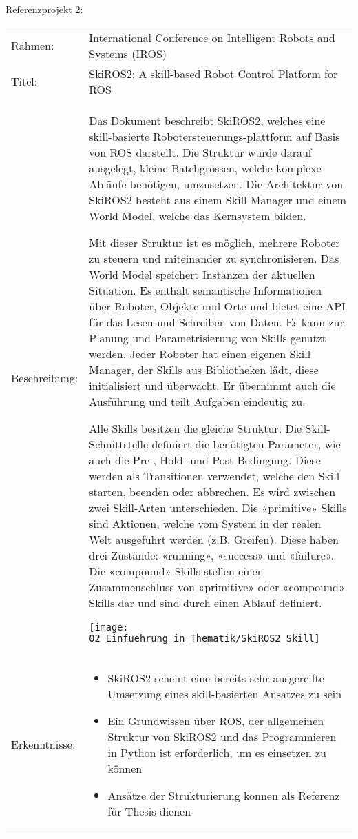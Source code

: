 	\newpage
	
	Referenzprojekt 2:
	\vspace{2mm}
	\\
	\begin{tabularx}{\textwidth}{@{}>{}p{8em} X@{}}
		Rahmen: & 
		International Conference on Intelligent Robots and Systems (IROS)
		\\
		
		Titel: & 
		SkiROS2: A skill-based Robot Control Platform for ROS 
		\\
		
		Beschreibung: & 
		Das Dokument beschreibt SkiROS2, welches eine skill-basierte Robotersteuerungs-plattform auf Basis von ROS darstellt.  Die Struktur wurde darauf ausgelegt, kleine Batchgrössen, welche komplexe Abläufe benötigen, umzusetzen.  Die Architektur von SkiROS2 besteht aus einem Skill Manager und einem World Model, welche das Kernsystem bilden.
		
		Mit dieser Struktur ist es möglich, mehrere Roboter zu steuern und miteinander zu synchronisieren. Das World Model speichert Instanzen der aktuellen Situation. Es enthält semantische Informationen über Roboter, Objekte und Orte und bietet eine API für das Lesen und Schreiben von Daten. Es kann zur Planung und Parametrisierung von Skills genutzt werden. Jeder Roboter hat einen eigenen Skill Manager, der Skills aus Bibliotheken lädt, diese initialisiert und überwacht. Er übernimmt auch die Ausführung und teilt Aufgaben eindeutig zu.
		
		Alle Skills besitzen die gleiche Struktur. Die Skill-Schnittstelle definiert die benötigten Parameter, wie auch die Pre-, Hold- und Post-Bedingung. Diese werden als Transitionen verwendet, welche den Skill starten, beenden oder abbrechen. Es wird zwischen zwei Skill-Arten unterschieden. Die «primitive» Skills sind Aktionen, welche vom System in der realen Welt ausgeführt werden (z.B. Greifen). Diese haben drei Zustände: «running», «success» und «failure». Die «compound» Skills stellen einen Zusammenschluss von «primitive» oder «compound» Skills dar und sind durch einen Ablauf definiert. 
		
		\texttt{[image: 02\_Einfuehrung\_in\_Thematik/SkiROS2\_Skill]}
		\\
		
		Erkenntnisse: & 
		\begin{itemize}
			\item SkiROS2 scheint eine bereits sehr ausgereifte Umsetzung eines skill-basierten Ansatzes zu sein 
			\item Ein Grundwissen über ROS, der allgemeinen Struktur von SkiROS2 und das Programmieren in Python ist erforderlich, um es einsetzen zu können
			\item Ansätze der Strukturierung können als Referenz für Thesis dienen
		\end{itemize}
	\end{tabularx}
	
